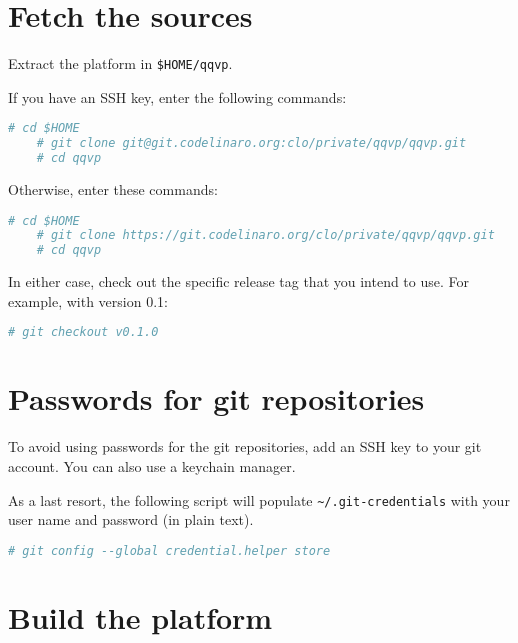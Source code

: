 \section{Fetch the sources}

Extract the platform in {\small{\lstinline!$HOME/qqvp!}}.

If you have an SSH key, enter the following commands:

\small
\begin{lstlisting}[language=bash]
    # cd $HOME
    # git clone git@git.codelinaro.org:clo/private/qqvp/qqvp.git
    # cd qqvp
\end{lstlisting}
\normalsize

Otherwise, enter these commands:

\small
\begin{lstlisting}[language=bash]
    # cd $HOME
    # git clone https://git.codelinaro.org/clo/private/qqvp/qqvp.git
    # cd qqvp
\end{lstlisting}
\normalsize

In either case, check out the specific release tag that you intend to use. For example, with version 0.1:

\small
\begin{lstlisting}[language=bash]
    # git checkout v0.1.0
\end{lstlisting}
\normalsize


\section{Passwords for git repositories}
\label{sec:passwords-git-repos}

To avoid using passwords for the git repositories, add an SSH key to your git account. You can also use a keychain manager.

As a last resort, the following script will populate {\small{\lstinline!~/.git-credentials!}} with your user name and password (in plain text).

\small
\begin{lstlisting}[language=bash]
    # git config --global credential.helper store
\end{lstlisting}
\normalsize


\section{Build the platform}

